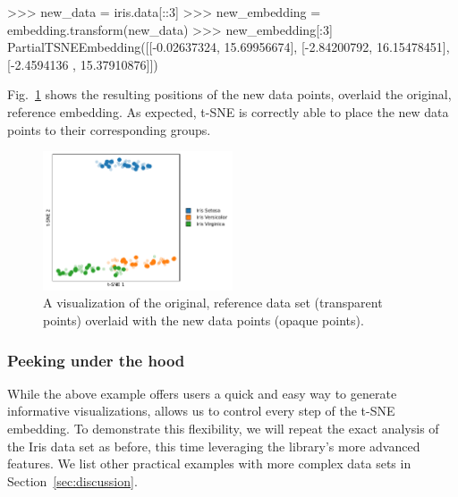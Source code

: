 \documentclass[article]{jss}
\newcommand{\opentsne}{\pkg{openTSNE}\xspace}
\begin{document}
\begin{CodeChunk}
\begin{CodeInput}
>>> new_data = iris.data[::3]
>>> new_embedding = embedding.transform(new_data)
>>> new_embedding[:3]
PartialTSNEEmbedding([[-0.02637324, 15.69956674],
                      [-2.84200792, 16.15478451],
                      [-2.4594136 , 15.37910876]])
\end{CodeInput}
\end{CodeChunk}
Fig.~\ref{fig:iris-transform} shows the resulting positions of the new data points, overlaid the original, reference embedding. As expected, t-SNE is correctly able to place the new data points to their corresponding groups.
\begin{figure}[htbp]
  \centering
  \includegraphics[width=0.5\textwidth]{iris-transform}
  \caption{\label{fig:iris-transform}
  A visualization of the original, reference data set (transparent points) overlaid with the new data points (opaque points).
}
\end{figure}


\subsubsection{Peeking under the hood}

While the above example offers users a quick and easy way to generate informative visualizations, \opentsne allows us to control every step of the t-SNE embedding. To demonstrate this flexibility, we will repeat the exact analysis of the Iris data set as before, this time leveraging the library's more advanced features. We list other practical examples with more complex data sets in Section~\ref{sec:discussion}.
\end{document}
